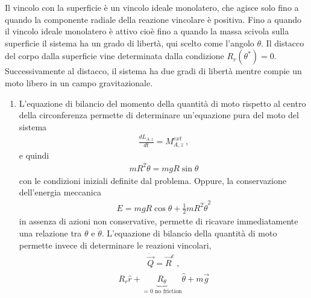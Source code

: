 \documentclass[letterpaper,10pt,italian]{jupyterBook}
\begin{document}
\sphinxAtStartPar
Il vincolo con la superficie è un vincolo ideale monolatero, che agisce solo fino a quando la componente radiale della reazione vincolare è positiva. Fino a quando il vincolo ideale monolatero è attivo \sphinxhyphen{} cioè fino a quando la massa scivola sulla superficie \sphinxhyphen{} il sistema ha un grado di libertà, qui scelto come l’angolo \(\theta\). Il distacco del corpo dalla superficie vine determinata dalla condizione \(R_r(\theta^*) = 0\). Successivamente al distacco, il sistema ha due gradi di libertà mentre compie un moto libero in un campo gravitazionale.
\begin{enumerate}
%
\item {} 
\sphinxAtStartPar
L’equazione di bilancio del momento della quantità di moto rispetto al centro della circonferenza permette di determinare un’equazione pura del moto del sistema
\begin{equation*}
\begin{split}\frac{d L_{A,z}}{d t} = M_{A,z}^{ext} \ ,\end{split}
\end{equation*}
\sphinxAtStartPar
e quindi
\begin{equation*}
\begin{split}m R^2 \ddot{\theta} = m g R \sin \theta\end{split}
\end{equation*}
\sphinxAtStartPar
con le condizioni iniziali definite dal problema. Oppure, la conservazione dell’energia meccanica
\begin{equation}\label{equation:ch/mechanics/dynamics-problems:mechanics:ex28:energy}
\begin{split}E = m g R \cos \theta + \frac{1}{2} m R^2 \dot{\theta}^2\end{split}
\end{equation}
\sphinxAtStartPar
in assenza di azioni non conservative, permette di ricavare immediatamente una relazione tra \(\theta\) e \(\dot{\theta}\).
L’equazione di bilancio della quantità di moto permette invece di determinare le reazioni vincolari,
\begin{equation*}
\begin{split}\dot{\vec{Q}} = \vec{R}^e \ ,\end{split}
\end{equation*}\begin{equation*}
\begin{split}\begin{aligned}
      R_r \hat{r} + \underbrace{R_{\theta}}_{= 0 \text{ no friction}} \hat{\theta} + m \vec{g} 

\end{aligned}
\end{split}
\end{equation*}
\end{enumerate}
\end{document}

